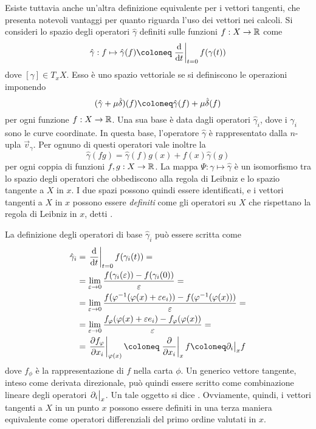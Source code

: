 Esiste tuttavia anche un'altra definizione equivalente per i vettori tangenti, che presenta notevoli vantaggi per quanto riguarda l'uso dei vettori nei calcoli. Si consideri lo spazio degli operatori $\hat{\gamma}$ definiti sulle funzioni $f: X \to \mathbb{R}$ come 
\begin{equation}
  \hat{\gamma}: f \mapsto \hat{\gamma}(f) \defeq \eval{\dv{t}}_{t=0} f(\gamma(t)) 
\end{equation}
dove $[\gamma] \in T_x X$. Esso è uno spazio vettoriale se si definiscono le operazioni imponendo
\begin{equation}
  (\hat{\gamma} + \mu \hat{\delta}) (f) \defeq \hat{\gamma}(f) + \mu \hat{\delta}(f)
\end{equation}
per ogni funzione $f:X\to \mathbb{R}$. Una sua base è data dagli operatori $\hat{\gamma}_i$, dove i $\gamma_i$ sono le curve coordinate. In questa base, l'operatore $\hat{\gamma}$ è rappresentato dalla $n$-upla $\vec{v}_\gamma$. Per ognuno di questi operatori vale inoltre la 
\begin{equation}
\hat{\gamma}(fg) = \hat{\gamma}(f)g(x) + f(x)\hat{\gamma}(g)
\end{equation}
per ogni coppia di funzioni $f,g:X\to \mathbb{R}$. La mappa $\Psi: \gamma \mapsto \hat{\gamma}$ è un isomorfismo tra lo spazio degli operatori che obbediscono alla regola di Leibniz e lo spazio tangente a $X$ in $x$. I due spazi possono quindi essere identificati, e i vettori tangenti a $X$ in $x$ possono essere \emph{definiti} come gli operatori su $X$ che rispettano la regola di Leibniz in $x$, detti .

La definizione degli operatori di base $\hat{\gamma}_i$ può essere scritta come \begin{equation}
\begin{aligned}
  \hat{\gamma}_i &= \eval{\dv{t}}_{t=0} f(\gamma_i(t)) = \\
  &= \lim_{\epsilon \to 0} \frac{f(\gamma_i(\epsilon))-f(\gamma_i(0))}{\epsilon} = \\
  &= \lim_{\epsilon \to 0} \frac{f(\phi^{-1}(\phi(x)+\epsilon e_i))-f(\phi^{-1}(\phi(x)))}{\epsilon} = \\
  &= \lim_{\epsilon \to 0} \frac{f_{\phi}(\phi(x)+\epsilon e_i)-f_{\phi}(\phi(x))}{\epsilon} = \\
  &= \eval{\pdv{f_{\phi}}{x_i}}_{\phi(x)} \defeq \eval{\pdv{x_i}}_x f \defeq \partial_i\big|_x f
\end{aligned}
\end{equation} 
dove $f_{\phi}$ è la rappresentazione di $f$ nella carta $\phi$. Un generico vettore tangente, inteso come derivata direzionale, può quindi essere scritto come combinazione lineare degli operatori $\eval{\partial_i}_x$. Un tale oggetto si dice . Ovviamente, quindi, i vettori tangenti a $X$ in un punto $x$ possono essere definiti in una terza maniera equivalente come operatori differenziali del primo ordine valutati in $x$.

